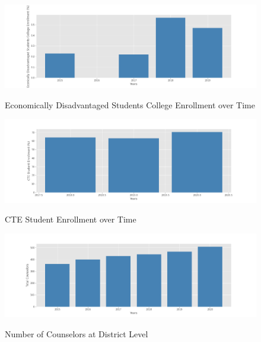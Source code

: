 \documentclass[10pt]{beamer}
\begin{document}
\begin{frame}{}
    \begin{figure}
        \caption{Economically Disadvantaged Students College Enrollment over Time}
        \includegraphics[width=17cm]{EDS Students College Enrollment.png}
        \label{fig4}
    \end{figure}
\end{frame}


\begin{frame}{}
    \begin{figure}
        \caption{CTE Student Enrollment over Time}
        \includegraphics[width=17cm]{CTE Student Enrollment.png}
        \label{fig3}
    \end{figure}
\end{frame}

\begin{frame}{}
    \begin{figure}
        \caption{Number of Counselors at District Level}
        \includegraphics[width=17cm]{Total Counselors.png}
        \label{fig5}
    \end{figure}
\end{frame}
\end{document}
